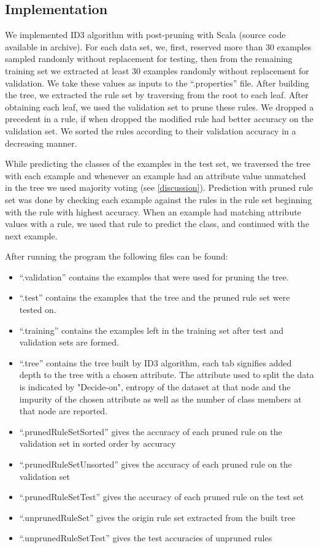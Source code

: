 \documentclass[12pt]{article}
\begin{document}
\subsection{Implementation}
We implemented ID3 algorithm with post-pruning with Scala (source code
available in archive). For each data set, we, first, reserved more
than 30 examples sampled randomly without replacement for testing,
then from the remaining training set we extracted at least 30 examples
randomly without replacement for validation. We take these values as
inputs to the ``.properties'' file. After building the tree, we
extracted the rule set by traversing from the root to each leaf. After
obtaining each leaf, we used the validation set to prune these
rules. We dropped a precedent in a rule, if when dropped the modified
rule had better accuracy on the validation set. We sorted the rules
according to their validation accuracy in a decreasing manner.

While predicting the classes of the examples in the test set, we
traversed the tree with each example and whenever an example had an
attribute value unmatched in the tree we used majority voting (see
\ref{discussion}). Prediction with pruned rule set was done by
checking each example against the rules in the rule set beginning with
the rule with highest accuracy. When an example had matching attribute
values with a rule, we used that rule to predict the class, and
continued with the next example.

After running the program the following files can be found:
\begin{itemize}
   \item ``.validation'' contains the examples that were used for
pruning the tree.
   \item ``.test'' contains the examples that the tree and the pruned
rule set were tested on.
   \item ``.training'' contains the examples left in the training set
after test and validation sets are formed.
   \item ``.tree'' contains the tree built by ID3 algorithm, each tab
signifies added depth to the tree with a chosen attribute. The
attribute used to split the data is indicated by "Decide-on", entropy
of the dataset at that node and the impurity of the chosen attribute
as well as the number of class members at that node are reported.
   \item ``.prunedRuleSetSorted'' gives the accuracy of each pruned
rule on the validation set in sorted order by accuracy
   \item ``.prunedRuleSetUnsorted'' gives the accuracy of each pruned
rule on the validation set
   \item ``.prunedRuleSetTest'' gives the accuracy of each pruned rule
on the test set
   \item ``.unprunedRuleSet'' gives the origin rule set extracted from
the built tree
   \item ``.unprunedRuleSetTest'' gives the test accuracies of
unpruned rules
\end{itemize}
\end{document}
